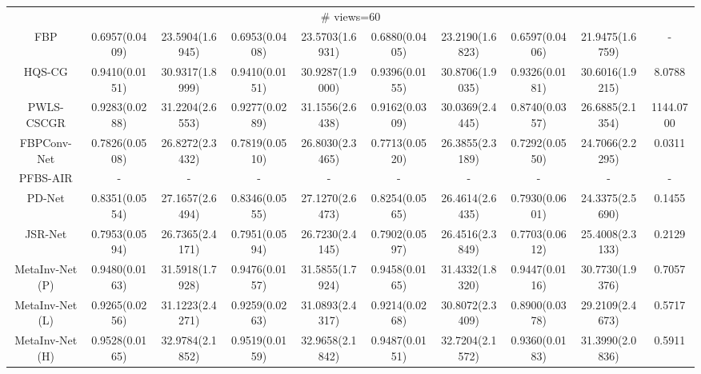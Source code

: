 \documentclass[journal,twoside]{IEEEtran}
\begin{document}
\begin{table*}[ht]
\begin{tabular}{|c|c|c|c|c|c|c|c|c|c|}
  
 \multicolumn{10}{|c|}{\cellcolor{gbygreen}\# views=60} \\
  \cline{1-10}
 FBP
&0.6957(0.0409) &23.5904(1.6945) 
&0.6953(0.0408) &23.5703(1.6931) 
&0.6880(0.0405) &23.2190(1.6823) 
&0.6597(0.0406) &21.9475(1.6759) &-\\
  \cline{1-10}
 HQS-CG 
&0.9410(0.0151) &30.9317(1.8999) 
&0.9410(0.0151) &30.9287(1.9000) 
&0.9396(0.0155) &30.8706(1.9035) 
&0.9326(0.0181) &30.6016(1.9215) &8.0788\\
  \cline{1-10}
PWLS-CSCGR 
&0.9283(0.0288) &31.2204(2.6553) 
&0.9277(0.0289) &31.1556(2.6438) 
&0.9162(0.0309) &30.0369(2.4445) 
&0.8740(0.0357) &26.6885(2.1354) &1144.0700\\
    \cline{1-10}
FBPConv-Net 
&0.7826(0.0508) &26.8272(2.3432) 
&0.7819(0.0510) &26.8030(2.3465) 
&0.7713(0.0520) &26.3855(2.3189) 
&0.7292(0.0550) &24.7066(2.2295) &0.0311\\
    \cline{1-10}
 PFBS-AIR 
&- &- &- &- &- &- &- &- &-\\
    \cline{1-10}
 PD-Net 
&0.8351(0.0554) &27.1657(2.6494) 
&0.8346(0.0555) &27.1270(2.6473) 
&0.8254(0.0565) &26.4614(2.6435) 
&0.7930(0.0601) &24.3375(2.5690) &0.1455\\
  \cline{1-10}
  JSR-Net
&0.7953(0.0594) &26.7365(2.4171) 
&0.7951(0.0594) &26.7230(2.4145) 
&0.7902(0.0597) &26.4516(2.3849) 
&0.7703(0.0612) &25.4008(2.3133) &0.2129\\
  \cline{1-10}
  MetaInv-Net (P)
&\cellcolor{gbyblue}0.9480(0.0163) &\cellcolor{gbyblue}31.5918(1.7928) 
&\cellcolor{gbyblue}0.9476(0.0157) &\cellcolor{gbyblue}31.5855(1.7924) 
&\cellcolor{gbyblue}0.9458(0.0165) &\cellcolor{gbyblue}31.4332(1.8320) 
&\cellcolor{gbypink}0.9447(0.0116) &\cellcolor{gbyblue}30.7730(1.9376) & 0.7057\\
 \cline{1-10}
MetaInv-Net (L) 
&0.9265(0.0256) &31.1223(2.4271) 
&0.9259(0.0263) &31.0893(2.4317) 
&0.9214(0.0268) &30.8072(2.3409) 
&0.8900(0.0378) &29.2109(2.4673) &0.5717\\
  \cline{1-10}
  MetaInv-Net (H) 
&\cellcolor{gbypink}0.9528(0.0165) &\cellcolor{gbypink}32.9784(2.1852) 
&\cellcolor{gbypink}0.9519(0.0159) &\cellcolor{gbypink}32.9658(2.1842) 
&\cellcolor{gbypink}0.9487(0.0151) &\cellcolor{gbypink}32.7204(2.1572) 
&\cellcolor{gbyblue}0.9360(0.0183) &\cellcolor{gbypink}31.3990(2.0836) &0.5911\\
 \cline{1-10}
  

\end{tabular}
\end{table*}
\end{document}

